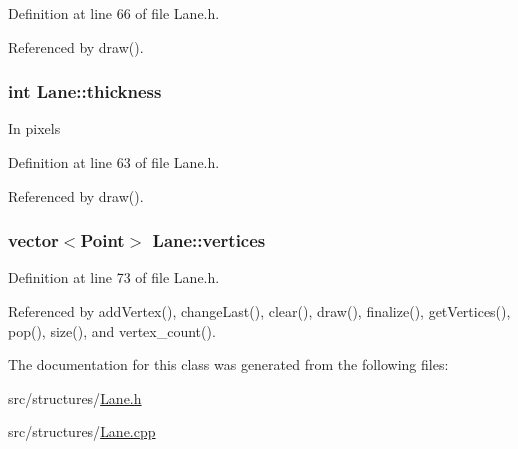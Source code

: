 \-Definition at line 66 of file \-Lane.\-h.



\-Referenced by draw().

\hypertarget{class_lane_aa614d556df980a9cf8974f77c69a1e10}{
\subsubsection[{thickness}]{\setlength{\rightskip}{0pt plus 5cm}int {\bf \-Lane\-::thickness}}}
\label{class_lane_aa614d556df980a9cf8974f77c69a1e10}
\-In pixels 

\-Definition at line 63 of file \-Lane.\-h.



\-Referenced by draw().

\hypertarget{class_lane_a77c7a2a168f611cebd7a8bccdf17dedb}{
\subsubsection[{vertices}]{\setlength{\rightskip}{0pt plus 5cm}vector$<$\-Point$>$ {\bf \-Lane\-::vertices}}}
\label{class_lane_a77c7a2a168f611cebd7a8bccdf17dedb}


\-Definition at line 73 of file \-Lane.\-h.



\-Referenced by add\-Vertex(), change\-Last(), clear(), draw(), finalize(), get\-Vertices(), pop(), size(), and vertex\-\_\-count().



\-The documentation for this class was generated from the following files\-:\begin{DoxyCompactItemize}
\item 
src/structures/\hyperlink{_lane_8h}{\-Lane.\-h}\item 
src/structures/\hyperlink{_lane_8cpp}{\-Lane.\-cpp}\end{DoxyCompactItemize}
